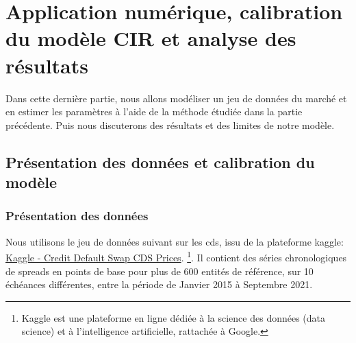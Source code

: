 
\part{Application numérique, calibration du modèle CIR et analyse des résultats}

Dans cette dernière partie, nous allons modéliser un jeu de données du marché et en estimer les paramètres à l'aide de la méthode étudiée dans la partie précédente. Puis nous discuterons des résultats et des limites de notre modèle.



\chapter{Présentation des données et calibration du modèle}

\section{Présentation des données}

Nous utilisons le jeu de données suivant sur les \gls{cds}, issu de la plateforme kaggle: \href{https://www.kaggle.com/datasets/debashish311601/credit-default-swap-cds-prices}{Kaggle - Credit Default Swap CDS Prices}. \footnote{Kaggle est une plateforme en ligne dédiée à la science des données (data science) et à l'intelligence artificielle, rattachée à Google.}. Il contient des séries chronologiques de spreads en points de base pour plus de 600 entités de référence, sur 10 échéances différentes, entre la période de Janvier 2015 à Septembre 2021.


